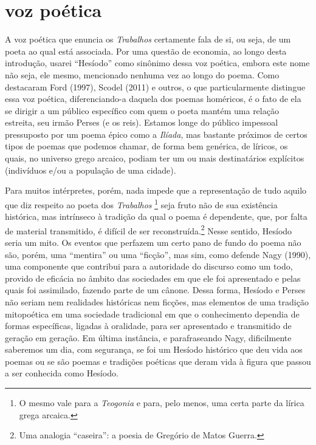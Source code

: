 \section{voz poética}

A voz poética que enuncia os \textit{Trabalhos} certamente fala de si,
ou seja, de um poeta ao qual está associada. Por uma questão de
economia, ao longo desta introdução, usarei “Hesíodo” como sinônimo
dessa voz poética, embora este nome não seja, ele mesmo, mencionado
nenhuma vez ao longo do poema. Como destacaram Ford (1997), Scodel (2011)
e outros, o que particularmente distingue essa voz poética, diferenciando-a daquela
dos poemas homéricos, é o fato de ela se dirigir a um público específico com quem
o poeta mantém uma relação estreita, seu irmão Perses (e os reis).
Estamos longe do público impessoal pressuposto por um poema épico como
a \textit{Ilíada}, mas bastante próximos de certos tipos de poemas que
podemos chamar, de forma bem genérica, de líricos, os quais, no
universo grego arcaico, podiam ter um ou mais destinatários explícitos
(indivíduos e/ou a população de uma cidade).

Para muitos intérpretes, porém, nada impede que a representação de tudo
aquilo que diz respeito ao poeta dos \textit{Trabalhos} \footnote{ O mesmo vale
para a \textit{Teogonia} e para, pelo menos, uma certa parte da lírica
grega arcaica.} seja fruto não de sua existência histórica, mas intrínseco à tradição 
da qual o poema é dependente, que, por falta de material transmitido, é difícil de ser 
reconstruída.\footnote{ Uma analogia “caseira”: a poesia de Gregório de Matos Guerra.} 
Nesse sentido, Hesíodo seria um mito. Os eventos que perfazem um certo pano de fundo
do poema não são, porém, uma “mentira” ou uma “ficção”, mas sim, como
defende Nagy (1990), uma componente que contribui para a autoridade do
discurso como um todo, provido de eficácia no âmbito das
sociedades em que ele foi apresentado e pelas quais foi assimilado,
fazendo parte de um cânone. Dessa forma, Hesíodo e Perses não
seriam nem realidades históricas nem ficções, mas elementos de uma
tradição mitopoética em uma sociedade tradicional em que o conhecimento dependia 
de formas específicas, ligadas à oralidade, para ser apresentado e transmitido 
de geração em geração. Em última instância, e parafraseando Nagy, dificilmente
saberemos um dia, com segurança, se foi um Hesíodo histórico que deu
vida aos poemas ou se são poemas e tradições poéticas que deram vida à 
figura que passou a ser conhecida como Hesíodo.

